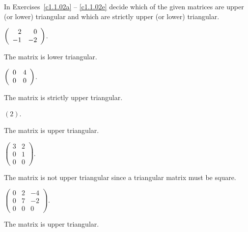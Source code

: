 \documentclass{ximera}
\begin{document}
\noindent In Exercises~\ref{c1.1.02a} -- \ref{c1.1.02e} decide which
of the given matrices are upper (or lower) triangular and which are
strictly upper (or lower) triangular.

\begin{exercise} \label{c1.1.02a}
  $\left(\begin{array}{rr} 2 & 0\\ -1 &-2\end{array}\right)$.

\begin{solution}
\ans The matrix is lower triangular.

\end{solution}
\end{exercise}
\begin{exercise} \label{c1.1.02b}
  $\left(\begin{array}{rr} 0 & 4\\ 0 &0\end{array}\right)$.

\begin{solution}
\ans The matrix is strictly upper triangular.

\end{solution}
\end{exercise}
\begin{exercise} \label{c1.1.02c}
  $(2)$.

\begin{solution}
\ans The matrix is upper triangular.

\end{solution}
\end{exercise}
\begin{exercise} \label{c1.1.02d}
  $\left( \begin{array}{rr}
            3 & 2 \\
            0 & 1 \\
            0 & 0 \end{array} \right)$.

\begin{solution}
\ans The matrix is not upper triangular since a triangular
matrix must be square.


\end{solution}
\end{exercise}
\begin{exercise} \label{c1.1.02e}
  $\left( \begin{array}{rrr}
            0 & 2 & -4\\
            0 & 7 & -2\\
            0 & 0 & 0\end{array} \right)$.


\begin{solution}
\ans The matrix is upper triangular.

\end{solution}
\end{exercise}
\end{document}
